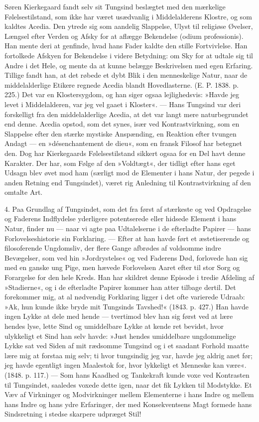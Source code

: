 \documentclass[12pt,a4paper,openany]{book}
\newcommand{\opage}[1]{\marginnote{\footnotesize\textit{[#1]}}}
\begin{document}
Søren Kierkegaard fandt selv sit Tungsind beslægtet
med den mærkelige Følelsestilstand, som ikke har været
usædvanlig i Middelalderens Klostre, og som kaldtes
Acedia. Den ytrede sig som aandelig Slappelse, Ulyst
til religiøse Øvelser, Længsel efter Verden og Afsky for
at aflægge Bekendelse (odium professionis). Han mente
deri at genfinde, hvad hans Fader kaldte den stille Fortvivlelse.
Han fortolkede Afskyen for Bekendelse i
videre Betydning: om Sky for at udtale sig til Andre i
det Hele, og mente da at kunne belægge Beskrivelsen
med egen Erfaring. Tillige fandt han, at det røbede et dybt
Blik i den menneskelige Natur, naar de middelalderlige
Etikere regnede Acedia blandt Hovedlasterne. (E. P. 1838.
p. 225.) Det var en Klostersygdom, og han siger ogsaa
lejlighedsvis: »Havde jeg levet i Middelalderen, var jeg
vel gaaet i Kloster«. --- Hans Tungsind var deri forskelligt
fra den middelalderlige Acedia, at det var langt
mere naturbegrundet end denne. Acedia opstod, som det
synes, især ved Kontrastvirkning, som en Slappelse efter
den stærke mystiske Anspænding, en Reaktion efter
tvungen Andagt --- en »désenchantement de dieu«, som
en fransk Filosof har betegnet den. Dog har Kierkegaards
Følelsestilstand sikkert ogsaa for en Del havt
denne Karakter. Der har, som Følge af den »Voldtægt«,
der tidligt efter hans eget Udsagn blev øvet mod ham
(særligt mod de Elementer i hans Natur, der pegede i
anden Retning end Tungsindet), været rig Anledning til
Kontrastvirkning af den omtalte Art.

4. Paa Grundlag af Tungsindet, som det fra først
af stærkeste og ved Opdragelse og Faderens Indflydelse
yderligere potentserede eller hidsede Element i hans
Natur, finder nu --- naar vi agte paa Udtalelserne i de
\opage{38}efterladte Papirer --- hans Forlovelseshistorie sin Forklaring.
--- Efter at han havde ført et æstetiserende og
filosoferende Ungdomsliv, der flere Gange afbrødes af
voldsomme indre Bevægelser, som ved hin »Jordrystelse«
og ved Faderens Død, forlovede han sig med en ganske
ung Pige, men hævede Forlovelsen Aaret efter til stor
Sorg og Forargelse for den hele Kreds. Han har skildret
denne Episode i tredie Afdeling af »Stadierne«, og
i de efterladte Papirer kommer han atter tilbage dertil.
Det forekommer mig, at al nødvendig Forklaring ligger
i det ofte varierede Udraab: »Ak, hun kunde ikke bryde
mit Tungsinds Tavshed!« (1843. p. 427.) Han havde
ingen Lykke at dele med hende --- tvertimod blev han
sig først ved at lære hendes lyse, lette Sind og umiddelbare
Lykke at kende ret bevidst, hvor ulykkeligt et Sind
han selv havde: »Just hendes umiddelbare ungdommelige
Lykke sat ved Siden af mit rædsomme Tungsind og i et
saadant Forhold maatte lære mig at forstaa mig selv; ti
hvor tungsindig jeg var, havde jeg aldrig anet før; jeg
havde egentligt ingen Maalestok for, hvor lykkeligt et
Menneske kan være«. (1848. p. 117.) --- Som hans Kaadhed
og Tankekraft kunde voxe ved Kontrasten til Tungsindet,
saaledes voxede dette igen, naar det fik Lykken
til Modstykke. Et Væv af Virkninger og Modvirkninger
mellem Elementerne i hans Indre og mellem hans Indre
og hans ydre Erfaringer, der med Konsekventsens Magt formede
hans Sindsretning i stedse skarpere udpræget Stil!
\end{document}
